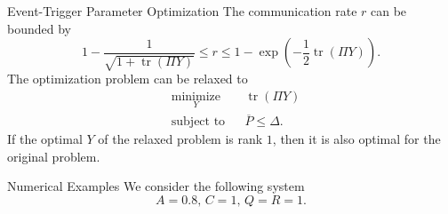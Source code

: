 \documentclass{beamer}
\newlength\figureheight
\newlength\figurewidth
\newcommand{\tikzdir}[1]{tikz/#1.tikz}
\newcommand{\inputtikz}[1]{}}
\DeclareMathOperator{\tr}{tr}
\begin{document}
  \begin{frame}{Event-Trigger Parameter Optimization}
    The communication rate $r$ can be bounded by
    \begin{displaymath}
      1-\frac{1}{\sqrt{1+\tr(\Pi Y)}} \leq  r \leq 1-\exp\left(-\frac{1}{2}\tr(\Pi Y)\right).
    \end{displaymath}
    The optimization problem can be relaxed to
    \begin{align*}
      &\mathop{\textrm{minimize}}\limits_{Y}&
      & \tr(\Pi Y)\nonumber\\
      &\textrm{subject to}&
      & \overline P\leq \Delta.
    \end{align*}
    If the optimal $Y$ of the relaxed problem is rank $1$, then it is also optimal for the original problem.
  \end{frame}

  \begin{frame}{Numerical Examples}
    We consider the following system
    \begin{displaymath}
     A = 0.8,\,C = 1,\, Q = R = 1. 
    \end{displaymath}
	\setlength\figureheight{5cm}
	\setlength\figurewidth{8cm}
    \begin{center}
      \inputtikz{eventbased}
    \end{center}
  \end{frame}
\end{document}
